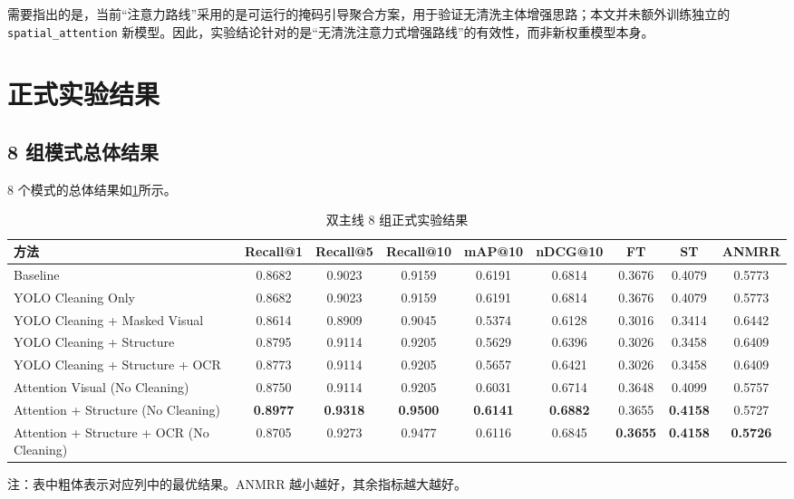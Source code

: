 需要指出的是，当前“注意力路线”采用的是可运行的掩码引导聚合方案，用于验证无清洗主体增强思路；本文并未额外训练独立的 \texttt{spatial\_attention} 新模型。因此，实验结论针对的是“无清洗注意力式增强路线”的有效性，而非新权重模型本身。

\section{正式实验结果}

\subsection{8 组模式总体结果}

8 个模式的总体结果如\cref{tab:all-eight-modes}所示。

\begin{table}[htbp]
  \centering
  \caption{双主线 8 组正式实验结果}
  \label{tab:all-eight-modes}
  \begin{adjustbox}{width=\textwidth}
    \small
    \setlength{\tabcolsep}{3.5pt}
    \begin{tabular}{p{4.4cm}cccccccc}
      \toprule
      方法 & Recall@1 & Recall@5 & Recall@10 & mAP@10 & nDCG@10 & FT & ST & ANMRR \\
      \midrule
      Baseline & 0.8682 & 0.9023 & 0.9159 & 0.6191 & 0.6814 & 0.3676 & 0.4079 & 0.5773 \\
      YOLO Cleaning Only & 0.8682 & 0.9023 & 0.9159 & 0.6191 & 0.6814 & 0.3676 & 0.4079 & 0.5773 \\
      YOLO Cleaning + Masked Visual & 0.8614 & 0.8909 & 0.9045 & 0.5374 & 0.6128 & 0.3016 & 0.3414 & 0.6442 \\
      YOLO Cleaning + Structure & 0.8795 & 0.9114 & 0.9205 & 0.5629 & 0.6396 & 0.3026 & 0.3458 & 0.6409 \\
      YOLO Cleaning + Structure + OCR & 0.8773 & 0.9114 & 0.9205 & 0.5657 & 0.6421 & 0.3026 & 0.3458 & 0.6409 \\
      Attention Visual (No Cleaning) & 0.8750 & 0.9114 & 0.9205 & 0.6031 & 0.6714 & 0.3648 & 0.4099 & 0.5757 \\
      Attention + Structure (No Cleaning) & \textbf{0.8977} & \textbf{0.9318} & \textbf{0.9500} & \textbf{0.6141} & \textbf{0.6882} & 0.3655 & \textbf{0.4158} & 0.5727 \\
      Attention + Structure + OCR (No Cleaning) & 0.8705 & 0.9273 & 0.9477 & 0.6116 & 0.6845 & \textbf{0.3655} & \textbf{0.4158} & \textbf{0.5726} \\
      \bottomrule
    \end{tabular}
  \end{adjustbox}
  \vspace{0.2em}
  \parbox{\textwidth}{\footnotesize 注：表中粗体表示对应列中的最优结果。ANMRR 越小越好，其余指标越大越好。}
\end{table}

